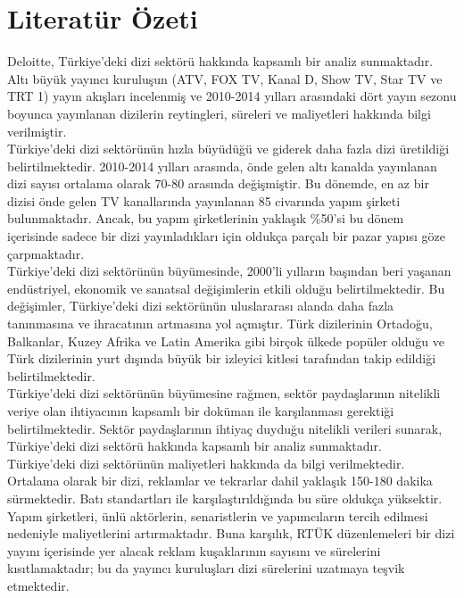 \section{Literatür Özeti}

\indent Deloitte, Türkiye'deki dizi sektörü hakkında kapsamlı bir analiz sunmaktadır. Altı büyük yayıncı kuruluşun (ATV, FOX TV, Kanal D, Show TV, Star TV ve TRT 1) yayın akışları incelenmiş ve 2010-2014 yılları arasındaki dört yayın sezonu boyunca yayınlanan dizilerin reytingleri, süreleri ve maliyetleri hakkında bilgi verilmiştir. \\

\indent Türkiye'deki dizi sektörünün hızla büyüdüğü ve giderek daha fazla dizi üretildiği belirtilmektedir. 2010-2014 yılları arasında, önde gelen altı kanalda yayınlanan dizi sayısı ortalama olarak 70-80 arasında değişmiştir. Bu dönemde, en az bir dizisi önde gelen TV kanallarında yayınlanan 85 civarında yapım şirketi bulunmaktadır. Ancak, bu yapım şirketlerinin yaklaşık \%50'si bu dönem içerisinde sadece bir dizi yayınladıkları için oldukça parçalı bir pazar yapısı göze çarpmaktadır. \\

\indent Türkiye'deki dizi sektörünün büyümesinde, 2000'li yılların başından beri yaşanan endüstriyel, ekonomik ve sanatsal değişimlerin etkili olduğu belirtilmektedir. Bu değişimler, Türkiye'deki dizi sektörünün uluslararası alanda daha fazla tanınmasına ve ihracatının artmasına yol açmıştır. Türk dizilerinin Ortadoğu, Balkanlar, Kuzey Afrika ve Latin Amerika gibi birçok ülkede popüler olduğu ve Türk dizilerinin yurt dışında büyük bir izleyici kitlesi tarafından takip edildiği belirtilmektedir. \\

\indent Türkiye'deki dizi sektörünün büyümesine rağmen, sektör paydaşlarının nitelikli veriye olan ihtiyacının kapsamlı bir doküman ile karşılanması gerektiği belirtilmektedir. Sektör paydaşlarının ihtiyaç duyduğu nitelikli verileri sunarak, Türkiye'deki dizi sektörü hakkında kapsamlı bir analiz sunmaktadır. \\

\indent Türkiye'deki dizi sektörünün maliyetleri hakkında da bilgi verilmektedir. Ortalama olarak bir dizi, reklamlar ve tekrarlar dahil yaklaşık 150-180 dakika sürmektedir. Batı standartları ile karşılaştırıldığında bu süre oldukça yüksektir. Yapım şirketleri, ünlü aktörlerin, senaristlerin ve yapımcıların tercih edilmesi nedeniyle maliyetlerini artırmaktadır. Buna karşılık, RTÜK düzenlemeleri bir dizi yayını içerisinde yer alacak reklam kuşaklarının sayısını ve sürelerini kısıtlamaktadır; bu da yayıncı kuruluşları dizi sürelerini uzatmaya teşvik etmektedir. \\

